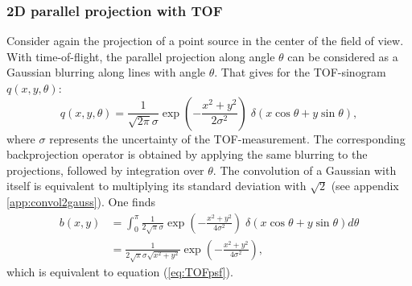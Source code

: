 \documentclass[11pt,oneside]{article}
\begin{document}
\subsubsection{2D parallel projection with TOF}
Consider again the projection of a point source in the center of the
field of view. With time-of-flight, the parallel projection along
angle $\theta$ can be considered as a Gaussian blurring along lines
with angle $\theta$. That gives for the TOF-sinogram $q(x,y,\theta)$:
\begin{equation}
 q(x,y,\theta) = \frac{1}{\sqrt{2\pi}\sigma}
               \exp(-\frac{x^2+y^2}{2 \sigma^2}) \;
              \delta(x\cos\theta + y\sin\theta),
\end{equation}
where $\sigma$ represents the uncertainty of the TOF-measurement. The
corresponding backprojection operator is obtained by applying the same
blurring to the projections, followed by integration over
$\theta$. The convolution of a Gaussian with itself is equivalent to
multiplying its standard deviation with $\sqrt{2}$ (see appendix
\ref{app:convol2gauss}). One finds
\begin{align}
  b(x,y) &= \int_0^\pi \frac{1}{2\sqrt{\pi}\sigma}
               \exp(-\frac{x^2+y^2}{4 \sigma^2}) \;
              \delta(x\cos\theta + y\sin\theta) d\theta\\
 &= \frac{1}{2\sqrt{\pi}\sigma \sqrt{x^2 + y^2}}
               \exp(-\frac{x^2+y^2}{4 \sigma^2}),
\end{align}
which is equivalent to equation (\ref{eq:TOFpsf}).
\end{document}
